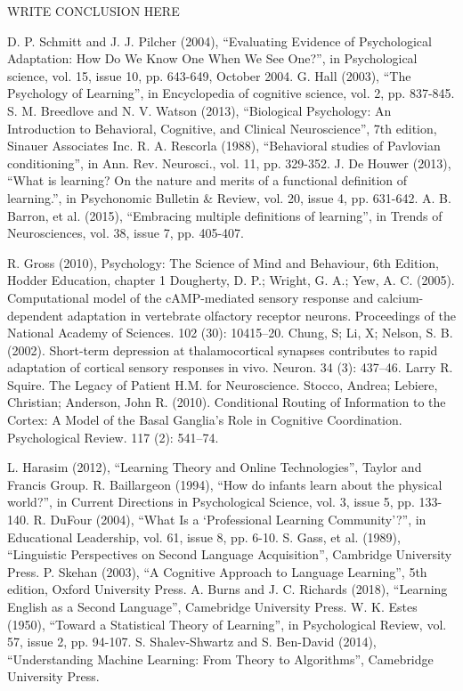 \documentclass[conference]{IEEEtran}
\begin{document}
	WRITE CONCLUSION HERE


\begin{thebibliography}{00}

 D. P. Schmitt and J. J. Pilcher (2004), “Evaluating Evidence of Psychological Adaptation: How Do We Know One When We See One?”, in Psychological science, vol. 15, issue 10, pp. 643-649, October 2004.
 G. Hall (2003), “The Psychology of Learning”, in Encyclopedia of cognitive science, vol. 2, pp. 837-845.
 S. M. Breedlove and N. V. Watson (2013), “Biological Psychology: An Introduction to Behavioral, Cognitive, and Clinical Neuroscience”, 7th edition, Sinauer Associates Inc.
 R. A. Rescorla (1988), “Behavioral studies of Pavlovian conditioning”, in Ann. Rev. Neurosci., vol. 11, pp. 329-352.
 J. De Houwer (2013), “What is learning? On the nature and merits of a functional definition of learning.”, in Psychonomic Bulletin \& Review, vol. 20, issue 4, pp. 631-642.
 A. B. Barron, et al. (2015), “Embracing multiple definitions of learning”, in Trends of Neurosciences, vol. 38, issue 7, pp. 405-407.

 R. Gross (2010), Psychology: The Science of Mind and Behaviour, 6th Edition, Hodder Education, chapter 1
 Dougherty, D. P.; Wright, G. A.; Yew, A. C. (2005). Computational model of the cAMP-mediated sensory response and calcium-dependent adaptation in vertebrate olfactory receptor neurons. Proceedings of the National Academy of Sciences. 102 (30): 10415–20.
 Chung, S; Li, X; Nelson, S. B. (2002). Short-term depression at thalamocortical synapses contributes to rapid adaptation of cortical sensory responses in vivo. Neuron. 34 (3): 437–46.
 Larry R. Squire. The Legacy of Patient H.M. for Neuroscience.
 Stocco, Andrea; Lebiere, Christian; Anderson, John R. (2010). Conditional Routing of Information to the Cortex: A Model of the Basal Ganglia's Role in Cognitive Coordination. Psychological Review. 117 (2): 541–74.

 L. Harasim (2012), “Learning Theory and Online Technologies”, Taylor and Francis Group.
 R. Baillargeon (1994), “How do infants learn about the physical world?”, in Current Directions in Psychological Science, vol. 3, issue 5, pp. 133-140.
 R. DuFour (2004), “What Is a ‘Professional Learning Community’?”, in Educational Leadership, vol. 61, issue 8, pp. 6-10.
 S. Gass, et al. (1989), “Linguistic Perspectives on Second Language Acquisition”, Cambridge University Press.
 P. Skehan (2003), “A Cognitive Approach to Language Learning”, 5th edition, Oxford University Press.
 A. Burns and J. C. Richards (2018), “Learning English as a Second Language”, Camebridge University Press.
 W. K. Estes (1950), “Toward a Statistical Theory of Learning”, in Psychological Review, vol. 57, issue 2, pp. 94-107.
 S. Shalev-Shwartz and S. Ben-David (2014), “Understanding Machine Learning: From Theory to Algorithms”, Camebridge University Press.



\end{thebibliography}
\end{document}
